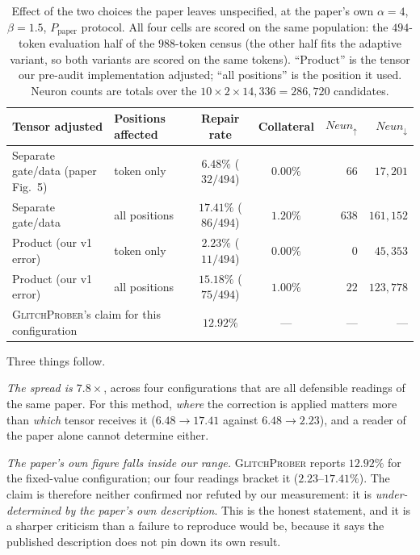 \documentclass[11pt,a4paper]{article}
\newcommand{\gp}{\textsc{GlitchProber}}
\newcommand{\Ppaper}{$P_{\mathrm{paper}}$}
\newcommand{\Neunup}{\ensuremath{\mathit{Neun}_{\uparrow}}}
\newcommand{\Neundown}{\ensuremath{\mathit{Neun}_{\downarrow}}}
\begin{document}
\begin{table}[h]
\centering
\caption{Effect of the two choices the paper leaves unspecified, at the paper's
own $\alpha = 4$, $\beta = 1.5$, \Ppaper{} protocol. All four cells are scored on
the same population: the $494$-token evaluation half of the $988$-token census
(the other half fits the adaptive variant, so both variants are scored on the same
tokens). ``Product'' is the tensor our pre-audit implementation adjusted;
``all positions'' is the position it used. Neuron counts are totals over the
$10 \times 2 \times 14{,}336 = 286{,}720$ candidates.}
\label{tab:implchoice}
\begin{tabular}{llccrr}
\toprule
Tensor adjusted & Positions affected & Repair rate & Collateral & \Neunup{} & \Neundown{} \\
\midrule
Separate gate/data (paper Fig.~5) & token only    & $6.48\%$ ($32/494$) & $0.00\%$ & $66$  & $17{,}201$ \\
Separate gate/data                & all positions & $17.41\%$ ($86/494$) & $1.20\%$ & $638$ & $161{,}152$ \\
Product (our v1 error)            & token only    & $2.23\%$ ($11/494$) & $0.00\%$ & $0$   & $45{,}353$ \\
Product (our v1 error)            & all positions & $15.18\%$ ($75/494$) & $1.00\%$ & $22$  & $123{,}778$ \\
\midrule
\multicolumn{2}{l}{\gp{}'s claim for this configuration} & $12.92\%$ & --- & --- & --- \\
\bottomrule
\end{tabular}
\end{table}

Three things follow.

\emph{The spread is $7.8\times$}, across four configurations that are all
defensible readings of the same paper. For this method, \emph{where} the
correction is applied matters more than \emph{which} tensor receives it
($6.48 \rightarrow 17.41$ against $6.48 \rightarrow 2.23$), and a reader of the
paper alone cannot determine either.

\emph{The paper's own figure falls inside our range.} \gp{} reports $12.92\%$ for
the fixed-value configuration; our four readings bracket it ($2.23$--$17.41\%$).
The claim is therefore neither confirmed nor refuted by our measurement: it is
\emph{under-determined by the paper's own description}. This is the honest
statement, and it is a sharper criticism than a failure to reproduce would be,
because it says the published description does not pin down its own result.
\end{document}
